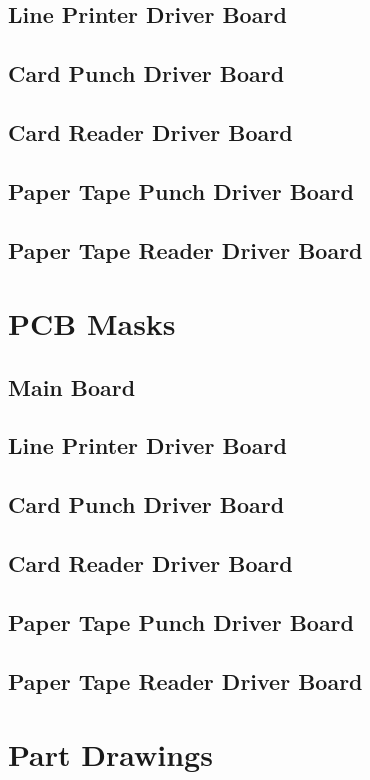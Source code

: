 \documentclass{book}
\begin{document}
\section{Line Printer Driver Board}
\cleardoublepage
\section{Card Punch Driver Board}
\cleardoublepage
\section{Card Reader Driver Board}
\cleardoublepage
\section{Paper Tape Punch Driver Board}
\cleardoublepage
\section{Paper Tape Reader Driver Board}
\chapter{PCB Masks}
\section{Main Board}
\cleardoublepage
\section{Line Printer Driver Board}
\cleardoublepage
\section{Card Punch Driver Board}
\cleardoublepage
\section{Card Reader Driver Board}
\cleardoublepage
\section{Paper Tape Punch Driver Board}
\cleardoublepage
\section{Paper Tape Reader Driver Board}
\chapter{Part Drawings}
\backmatter
\end{document}
